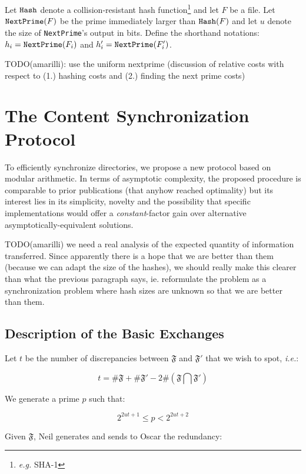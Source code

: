 \documentclass[11pt]{llncs}
\begin{document}
Let $\mbox{{\tt Hash}}$ denote a collision-resistant hash function\footnote{{\sl e.g.} SHA-1} and let $F$ be a file. Let $\mbox{{\tt NextPrime}}(F)$ be the prime immediately larger than $\mbox{{\tt Hash}}(F)$ and let $u$ denote the size of {\tt NextPrime}'s output in bits. Define the shorthand notations: $h_i=\mbox{{\tt NextPrime}}(F_i)$ and $h'_i=\mbox{{\tt NextPrime}}(F'_i)$.\smallskip

TODO(amarilli): use the uniform nextprime (discussion of relative costs with respect to (1.) hashing costs and (2.) finding the next prime costs)

\section{The Content Synchronization Protocol}

To efficiently synchronize directories, we propose a new protocol based on modular arithmetic. In terms of asymptotic complexity, the proposed procedure is comparable to prior publications \cite{} (that anyhow reached optimality) but its interest lies in its simplicity, novelty and the possibility that specific implementations would offer a {\sl constant}-factor gain over alternative asymptotically-equivalent solutions.\smallskip

TODO(amarilli) we need a real analysis of the expected quantity of information transferred. Since apparently there is a hope that we are better than them (because we can adapt the size of the hashes), we should really make this clearer than what the previous paragraph says, ie. reformulate the problem as a synchronization problem where hash sizes are unknown so that we are better than them.

\subsection{Description of the Basic Exchanges}

Let $t$ be the number of discrepancies between $\mathfrak{F}$ and $\mathfrak{F}'$ that we wish to spot, {\sl i.e.}:

$$t=\#\mathfrak{F}+\#\mathfrak{F}'-2 \#(\mathfrak{F} \bigcap \mathfrak{F}')$$

We generate a prime $p$ such that:

\begin{equation}
\label{equp}
2^{2ut+1} \leq p < 2^{2ut+2}
\end{equation}

Given $\mathfrak{F}$, Neil generates and sends to Oscar the redundancy:
\end{document}
